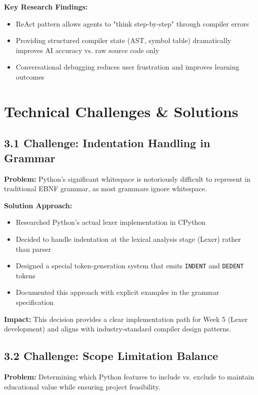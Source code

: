 \documentclass[a4paper,11pt]{article}
\begin{document}
\textbf{Key Research Findings:}
\begin{itemize}[leftmargin=*]
    \item ReAct pattern allows agents to "think step-by-step" through compiler errors
    \item Providing structured compiler state (AST, symbol table) dramatically improves AI accuracy vs. raw source code only
    \item Conversational debugging reduces user frustration and improves learning outcomes
\end{itemize}

\newpage

\section{Technical Challenges \& Solutions}

\subsection{3.1 Challenge: Indentation Handling in Grammar}

\textbf{Problem:} Python's significant whitespace is notoriously difficult to represent in traditional EBNF grammar, as most grammars ignore whitespace.

\textbf{Solution Approach:}
\begin{itemize}[leftmargin=*]
    \item Researched Python's actual lexer implementation in CPython
    \item Decided to handle indentation at the lexical analysis stage (Lexer) rather than parser
    \item Designed a special token-generation system that emits \texttt{INDENT} and \texttt{DEDENT} tokens
    \item Documented this approach with explicit examples in the grammar specification
\end{itemize}

\textbf{Impact:} This decision provides a clear implementation path for Week 5 (Lexer development) and aligns with industry-standard compiler design patterns.

\subsection{3.2 Challenge: Scope Limitation Balance}

\textbf{Problem:} Determining which Python features to include vs. exclude to maintain educational value while ensuring project feasibility.
\end{document}
